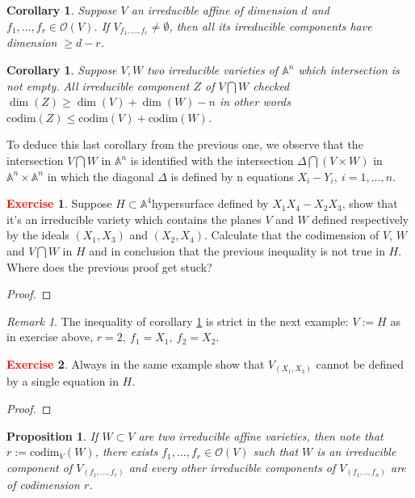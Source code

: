 \documentclass[12pt,a4paper,english]{article}
\theoremstyle{plain}
\newtheorem{prop}[thm]{Proposition}
\newtheorem{coro}[thm]{Corollary}
\theoremstyle{definition}
\newtheorem{exercise}{\textbf{\textcolor{red}{Exercise}}}
\theoremstyle{remark}
\newtheorem*{rem}{Remark}
\newcommand{\codim}{\mathrm{codim}}
\begin{document}
\begin{coro}
Suppose $V$ an irreducible affine of dimension $d$ and $f_{1},...,f_{r}\in\mathcal{O}(V)$. If $V_{f_{1},...,f_{r}}\not=\emptyset$, then all its irreducible components have dimension $\geq d-r$. 
\end{coro}
\begin{coro}\label{coroineq}
Suppose $V,W$ two irreducible varieties of $\mathbb{A}^{n}$ which intersection is not empty. All irreducible component $Z$ of $V\bigcap W$ checked $\dim(Z)\geq \dim(V)+\dim(W)-n$ in other words $\codim(Z)\leq \codim(V)+\codim(W)$.
\end{coro}
To deduce this last corollary from the previous one, we observe that the intersection $V\bigcap W$ in $\mathbb{A}^{n}$ is identified with the intersection $\Delta\bigcap (V\times W)$ in $\mathbb{A}^{n}\times\mathbb{A}^{n}$ in which the diagonal $\Delta$ is defined by n equations $X_{i}-Y_{i},\ i=1,...,n$.
\begin{exercise}
Suppose $H\subset\mathbb{A}^{4}$hypersurface defined by $X_{1}X_{4}-X_{2}X_{3}$, show that it's an irreducible variety which contains the planes $V$ and $W$ defined respectively by the ideals $(X_{1},X_{3})$ and $(X_{2},X_{4})$. Calculate that the codimension of $V$, $W$ and $V\bigcap W$ in $H$ and in conclusion that the previous inequality is not true in $H$. Where does the previous proof get stuck? 
\end{exercise}
\begin{tcolorbox}
\begin{proof}

\end{proof}
\end{tcolorbox}
\begin{rem}
The inequality of corollary \ref{coroineq} is strict in the next example: $V:= H$ as in exercise above, $r=2,\ f_{1}=X_{1},\ f_{2}=X_{2}$.
\end{rem}
\begin{exercise}
Always in the same example show that $V_{(X_{1},X_{3})}$ cannot be defined by a single equation in $H$.
\end{exercise}
\begin{tcolorbox}
\begin{proof}

\end{proof}
\end{tcolorbox}
\begin{prop}
If $W\subset V$ are two irreducible affine varieties, then note that $r:=\codim_{V}(W)$, there exists $f_{1},...,f_{r}\in\mathcal{O}(V)$ such that $W$ is an irreducible component of $V_{(f_{1},...,f_{r})}$ and every other irreducible components of $V_{(f_{1},..,f_{n})}$ are of codimension $r$.
\end{prop}
\end{document}
